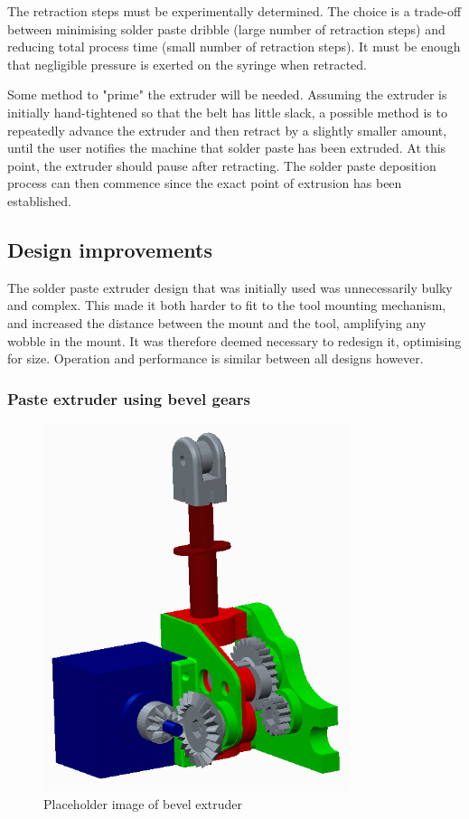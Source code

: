 The retraction steps must be experimentally determined. The choice is a trade-off between minimising solder paste dribble (large number
of retraction steps) and reducing total process time (small number of retraction steps). It must be enough that negligible pressure is
exerted on the syringe when retracted.

Some method to "prime" the extruder will be needed. Assuming the extruder is initially hand-tightened so that the belt has little slack,
a possible method is to repeatedly advance the extruder and then retract by a slightly smaller amount, until the user notifies the machine
that solder paste has been extruded. At this point, the extruder should pause after retracting. The solder paste deposition process can
then commence since the exact point of extrusion has been established. 

\subsection{Design improvements}
The solder paste extruder design that was initially used was unnecessarily bulky and complex. This made it both harder to fit to the tool mounting mechanism, and increased the
distance between the mount and the tool, amplifying any wobble in the mount. It was therefore deemed necessary to redesign it, optimising for size. Operation and performance
is similar between all designs however.

\subsubsection{Paste extruder using bevel gears}
\begin{figure}[ht!]
\centering
\includegraphics[width=90mm]{resources/extruder_bevel.png}
\caption{Placeholder image of bevel extruder}
\label{overflow}
\end{figure}

